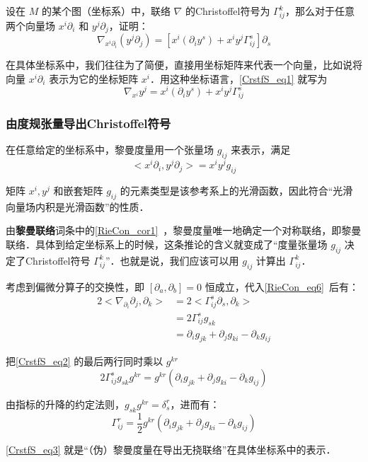 \begin{exercise}{}
设在 $M$ 的某个图（坐标系）中，联络 $\nabla$ 的Christoffel符号为 $\Gamma^k_{ij}$，那么对于任意两个向量场 $x^i\partial_i$ 和 $y^j\partial_j$，证明：
\begin{equation}\label{CrstfS_eq1}
\nabla_{x^i\partial_i}(y^j\partial_j)=[x^i(\partial_iy^s)+x^iy^j\Gamma^s_{ij}]\partial_s
\end{equation}
\end{exercise}

在具体坐标系中，我们往往为了简便，直接用坐标矩阵来代表一个向量，比如说将向量 $x^i\partial_i$ 表示为它的坐标矩阵 $x^i$．用这种坐标语言，\autoref{CrstfS_eq1} 就写为
\begin{equation}\label{CrstfS_eq4}
\nabla_{x^i}y^j=x^i(\partial_iy^s)+x^iy^j\Gamma^s_{ij}
\end{equation}

\subsubsection{由度规张量导出Christoffel符号}

在任意给定的坐标系中，黎曼度量用一个张量场 $g_{ij}$ 来表示，满足
\begin{equation}
<x^i\partial_i, y^j\partial_j>=x^iy^jg_{ij}
\end{equation}

矩阵 $x^i, y^j$ 和嵌套矩阵 $g_{ij}$ 的元素类型是该参考系上的光滑函数，因此符合“光滑向量场内积是光滑函数”的性质．

由\textbf{黎曼联络}词条中的\autoref{RieCon_cor1}~，黎曼度量唯一地确定一个对称联络，即黎曼联络．具体到给定坐标系上的时候，这条推论的含义就变成了“度量张量场 $g_{ij}$ 决定了Christoffel符号 $\Gamma^k_{ij}$”．也就是说，我们应该可以用 $g_{ij}$ 计算出 $\Gamma^k_{ij}$．

考虑到偏微分算子的交换性，即 $[\partial_a, \partial_b]=0$ 恒成立，代入\autoref{RieCon_eq6}~后有：
\begin{equation}\label{CrstfS_eq2}
\begin{aligned}
2<\nabla_{\partial_i}\partial_j, \partial_k>&=2<\Gamma^s_{ij}\partial_s, \partial_k>\\
&=2\Gamma^s_{ij}g_{sk}\\
&=\partial_ig_{jk}+\partial_jg_{ki}-\partial_kg_{ij}
\end{aligned}
\end{equation}

把\autoref{CrstfS_eq2} 的最后两行同时乘以 $g^{kr}$
\begin{equation}
2\Gamma^{s}_{ij}g_{sk}g^{kr}=g^{kr}(\partial_ig_{jk}+\partial_jg_{ki}-\partial_kg_{ij})
\end{equation}

由指标的升降的约定法则，$g_{sk}g^{kr}=\delta_s^r$，进而有：
\begin{equation}\label{CrstfS_eq3}
\Gamma^{r}_{ij}=\frac{1}{2}g^{kr}(\partial_ig_{jk}+\partial_jg_{ki}-\partial_kg_{ij})
\end{equation}

\autoref{CrstfS_eq3} 就是“（伪）黎曼度量在导出无挠联络”在具体坐标系中的表示．






